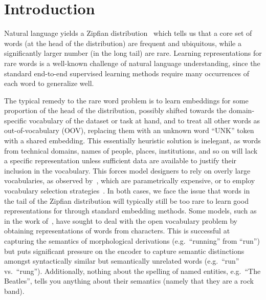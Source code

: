 \section{Introduction}
Natural language yields a Zipfian distribution~\citep{zipf1949human} which tells us that a core set of words (at the head of the distribution) are frequent and ubiquitous, while a significantly larger number (in the long tail) are rare. Learning representations for rare words is a well-known challenge of natural language understanding, since the standard end-to-end supervised learning methods require many occurrences of each word to generalize well.  

The typical remedy to the rare word problem is to learn embeddings for some proportion of the head of the distribution, possibly shifted towards the domain-specific vocabulary of the dataset or task at hand, and to treat all other words as out-of-vocabulary (OOV), replacing them with an unknown word ``UNK'' token with a shared embedding. This essentially heuristic solution is inelegant, as words from technical domains, names of people, places, institutions, and so on will lack a specific representation unless sufficient data are available to justify their inclusion in the vocabulary. This forces model designers to rely on overly large vocabularies, as observed by~\citep{mi2016vocabulary,sennrich2015neural}, which are parametrically expensive, or to employ vocabulary selection strategies~\citep{lvocabulary}. In both cases, we face the issue that words in the tail of the Zipfian distribution will typically still be too rare to learn good representations for through standard embedding methods. Some models, such as in the work of~\cite{ling2015finding}, have sought to deal with the open vocabulary problem by obtaining representations of words from characters. This is successful at capturing the semantics of morphological derivations (e.g.~``running'' from ``run'') but puts significant pressure on the encoder to capture semantic distinctions amongst syntactically similar but semantically unrelated words (e.g.~``run'' vs.~``rung''). Additionally, nothing about the spelling of named entities, e.g.~``The Beatles'', tells you anything about their semantics (namely that they are a rock band).

